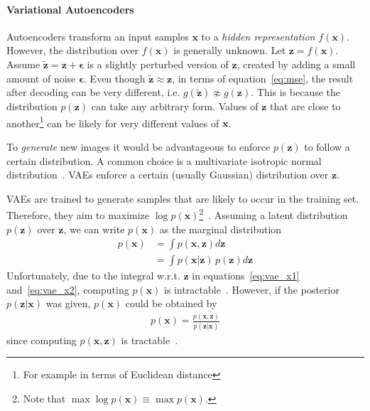 \paragraph{Variational Autoencoders}

Autoencoders transform an input samples $\bm{x}$ to a \textit{hidden representation} $f(\bm{x})$.
However, the distribution over $f(\bm{x})$ is generally unknown.
Let $\bm{z} = f(\bm{x})$.
Assume $\bm{\tilde{z}} = \bm{z} + \bm{\epsilon}$ is a slightly perturbed version of $\bm{z}$, created by adding a small amount of noise $\bm{\epsilon}$.
Even though $\bm{\tilde{z}} \approx \bm{z}$, in terms of equation~\ref{eq:mse}, the result after decoding can be very different, i.e. $g(\bm{\tilde{z}}) \not\approx g(\bm{z})$.
This is because the distribution $p(\bm{z})$ can take any arbitrary form.
Values of $\bm{z}$ that are close to another\footnote{For example in terms of Euclidean distance} can be likely for very different values of $\bm{x}$.

To \textit{generate} new images it would be advantageous to enforce $p(\bm{z})$ to follow a certain distribution.
A common choice is a multivariate isotropic normal distribution~\citep[pp. 24, 25]{kingma2019introduction}.
\acp{VAE} enforce a certain (usually Gaussian) distribution over $\bm{z}$.

\acp{VAE} are trained to generate samples that are likely to occur in the training set.
Therefore, they aim to maximize $\log p(\bm{x})$\footnote{Note that $\max \log  p(\bm{x}) \equiv \max  p(\bm{x})$.}~\citep[p. 18]{kingma2019introduction}.
Assuming a latent distribution $p(\bm{z})$ over $\bm{z}$, we can write $p(\bm{x})$ as the marginal distribution
\begin{align}
    p(\bm{x}) &= \int p(\bm{x}, \bm{z})d\bm{z} \label{eq:vae_x1}\\
    &= \int p(\bm{x}|\bm{z})\,p(\bm{z})d\bm{z} \label{eq:vae_x2}
\end{align}
Unfortunately, due to the integral w.r.t. $\bm{z}$ in equations~\ref{eq:vae_x1} and~\ref{eq:vae_x2}, computing $p(\bm{x})$ is intractable~\citep[p. 13]{kingma2019introduction}.
However, if the posterior $p(\bm{z}|\bm{x})$ was given, $p(\bm{x})$ could be obtained by
\begin{align}
    p(\bm{x}) = \frac{p(\bm{x}, \bm{z})}{p(\bm{z}|\bm{x})}
\end{align}
since computing $p(\bm{x}, \bm{z})$ is tractable~\citep[p. 14]{kingma2019introduction}.

